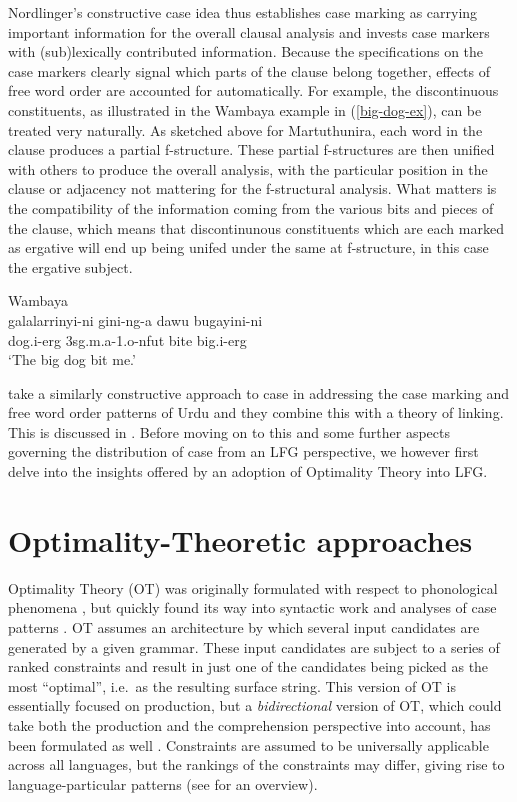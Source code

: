 \documentclass[output=paper,hidelinks]{langscibook}
\begin{document}
Nordlinger's constructive case idea thus establishes case marking as carrying
important information for the overall clausal analysis and invests case markers
with (sub)lexically contributed information.  Because the \GF specifications on
the case markers clearly signal which parts of the clause belong together,
effects of free word order are accounted for
automatically.  For example, the discontinuous constituents, 
as illustrated in the Wambaya example in (\ref{big-dog-ex}), 
can be treated very naturally.  As sketched above for
Martuthunira, each word in the clause produces a partial f-structure.  These
partial f-structures are then unified with others to produce the overall
analysis, with the particular position in the clause or adjacency not mattering for the
f-structural analysis.  What matters is the compatibility of the information
coming from the various bits and pieces of the clause, which means that
discontinunous constituents which are each marked as ergative will end up being
unifed under the same {\GF} at f-structure, in this case the ergative subject. 

\ea \label{big-dog-ex} Wambaya \citep[96]{nordlinger1998constructive}\\
\gll
{galalarrinyi-ni} {gini-ng-a}  {dawu} {bugayini-ni} \\
 {dog.{\sc i-erg}}  {\sc 3sg.m.a-1.o-nfut} {bite}  {big.{\sc i-erg}} \\
 \glt `The big dog bit me.' 
 \z

 \citet{buttking91,buttking05} take a similarly constructive approach to case 
 in addressing the case marking and free word order patterns of Urdu and they
 combine this with a theory of linking. This is discussed in .  Before moving on to this and some further aspects governing the
 distribution of case from an LFG perspective, we however first delve into the insights
 offered by an adoption of Optimality Theory into LFG.
 

\section{Optimality-Theoretic approaches}
\label{sec:ot}

Optimality Theory (OT) was originally formulated with respect to phonological
phenomena \citep{PrinceSmolensky1993,kager99}, but quickly found its way into
syntactic work \citep{Grimshaw97} and analyses of case patterns
\citep{legetal00}.  OT assumes an architecture by which several input candidates
are generated by a given grammar.  These input candidates are subject to a series
of ranked constraints and result in just one of the candidates being picked as
the most ``optimal'', i.e.~as the resulting surface string.  This version of OT
is essentially focused on production, but a {\em bidirectional} version of OT,
which could take both the production and the comprehension perspective into
account, has been formulated as well \citep{Blutner00,dekker-rooy2000}.
Constraints are assumed to be universally applicable across all languages, but
the rankings of the constraints may differ, giving rise to language-particular
patterns (see  for an overview).
\end{document}
